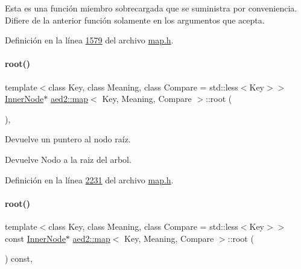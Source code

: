 Esta es una función miembro sobrecargada que se suministra por conveniencia. Difiere de la anterior función solamente en los argumentos que acepta. 

Definición en la línea \hyperlink{map_8h_source_l01579}{1579} del archivo \hyperlink{map_8h_source}{map.\+h}.

\mbox{\label{classaed2_1_1map_a07ab50eda249a57858a34037d4c4c7b2_a07ab50eda249a57858a34037d4c4c7b2}} 
\paragraph{\texorpdfstring{root()}{root()}\hspace{0.1cm}{\footnotesize\ttfamily [1/2]}}
{\footnotesize\ttfamily template$<$class Key, class Meaning, class Compare = std\+::less$<$\+Key$>$$>$ \\
\hyperlink{structaed2_1_1map_1_1InnerNode}{Inner\+Node}$\ast$ \hyperlink{classaed2_1_1map}{aed2\+::map}$<$ Key, Meaning, Compare $>$\+::root (\begin{DoxyParamCaption}{ }\end{DoxyParamCaption})\hspace{0.3cm}{\ttfamily [inline]}, {\ttfamily [private]}}



Devuelve un puntero al nodo raíz. 

\begin{DoxyReturn}{Devuelve}
Nodo a la raiz del arbol. 
\end{DoxyReturn}


Definición en la línea \hyperlink{map_8h_source_l02231}{2231} del archivo \hyperlink{map_8h_source}{map.\+h}.

\mbox{\label{classaed2_1_1map_a66fe019d885578cc52949409f80858eb_a66fe019d885578cc52949409f80858eb}} 
\paragraph{\texorpdfstring{root()}{root()}\hspace{0.1cm}{\footnotesize\ttfamily [2/2]}}
{\footnotesize\ttfamily template$<$class Key, class Meaning, class Compare = std\+::less$<$\+Key$>$$>$ \\
const \hyperlink{structaed2_1_1map_1_1InnerNode}{Inner\+Node}$\ast$ \hyperlink{classaed2_1_1map}{aed2\+::map}$<$ Key, Meaning, Compare $>$\+::root (\begin{DoxyParamCaption}{ }\end{DoxyParamCaption}) const\hspace{0.3cm}{\ttfamily [inline]}, {\ttfamily [private]}}

